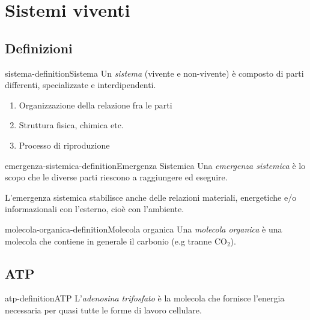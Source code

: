 \documentclass[preview]{standalone}
\begin{document}
\genpage

\section{Sistemi viventi}

\subsection{Definizioni}

\begin{snippetdefinition}{sistema-definition}{Sistema}
    Un \textit{sistema} (vivente e non-vivente) è composto di parti differenti, specializzate e interdipendenti. 
    
    \begin{enumerate}
        \item Organizzazione della relazione fra le parti
        \item Struttura fisica, chimica etc. 
        \item Processo di riproduzione
    \end{enumerate}
\end{snippetdefinition}

\begin{snippetdefinition}{emergenza-sistemica-definition}{Emergenza Sistemica}
    Una \textit{emergenza sistemica} è lo scopo che le diverse parti riescono a raggiungere ed eseguire.
\end{snippetdefinition}

\begin{plainhtml}
    L'emergenza sistemica stabilisce anche delle relazioni materiali, energetiche e/o informazionali con l'esterno, cioè con l'ambiente.
\end{plainhtml}

\begin{snippetdefinition}{molecola-organica-definition}{Molecola organica}
    Una \textit{molecola organica} è una molecola che contiene in generale il carbonio (e.g tranne CO\({}_2\)).
\end{snippetdefinition}

\subsection{ATP}

\begin{snippetdefinition}{atp-definition}{ATP}
    L'\textit{adenosina trifosfato} è la molecola che fornisce l'energia necessaria per quasi tutte le forme
    di lavoro cellulare.
\end{snippetdefinition}
\end{document}
